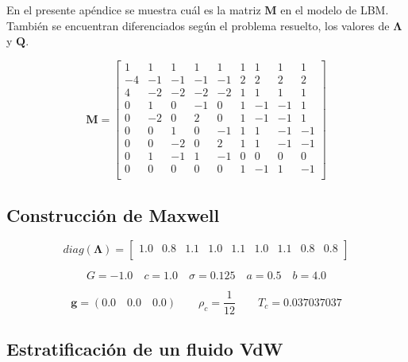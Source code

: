 \chapter{}
\label{ap}

En el presente apéndice se muestra cuál es la matriz $\mathbf{M}$ en el modelo de LBM. También se encuentran diferenciados según el problema resuelto, los valores de $\mathbf{\Lambda}$ y $\mathbf{Q}$.

\begin{equation}
\mathbf{M} =
\begin{bmatrix}
	1 & 1 & 1 & 1 & 1 & 1 & 1 & 1 & 1 \\
   -4 &-1 &-1 &-1 &-1 & 2 & 2 & 2 & 2 \\
    4 &-2 &-2 &-2 &-2 & 1 & 1 & 1 & 1 \\
    0 & 1 & 0 &-1 & 0 & 1 &-1 &-1 & 1 \\
    0 &-2 & 0 & 2 & 0 & 1 &-1 &-1 & 1 \\
    0 & 0 & 1 & 0 &-1 & 1 & 1 &-1 &-1 \\
    0 & 0 &-2 & 0 & 2 & 1 & 1 &-1 &-1 \\
    0 & 1 &-1 & 1 &-1 & 0 & 0 & 0 & 0 \\    
    0 & 0 & 0 & 0 & 0 & 1 &-1 & 1 &-1 \\        
\end{bmatrix}
\end{equation}

\section{Construcción de Maxwell}
\label{parametros_MxC}

\begin{equation}
	diag(\mathbf{\Lambda}) = 
	\begin{bmatrix}
		1.0 & 0.8 & 1.1 & 1.0 & 1.1 & 1.0 & 1.1 & 0.8 & 0.8 \\
	\end{bmatrix}
\end{equation}

\begin{equation}
G = -1.0 \quad c = 1.0 \quad \sigma = 0.125 \quad a = 0.5 \quad b = 4.0 
\end{equation}

\begin{equation}
\mathbf{g} = (0.0 \quad 0.0 \quad 0.0 ) \qquad \rho_c = \frac{1}{12} \qquad T_c = 0.037037037
\end{equation}

\section{Estratificación de un fluido VdW}
\label{parametros_VdW}

